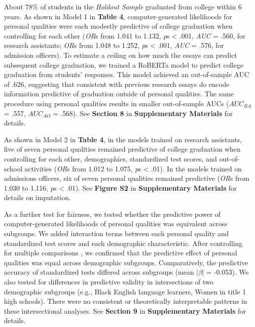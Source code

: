 \documentclass[11pt]{report}
\begin{document}
\begin{mainf}
About 78\% of students in the \textit{Holdout Sample} graduated from college within 6 years. As shown in Model 1 in \textbf{Table 4}, computer-generated likelihoods for personal qualities were each modestly predictive of college graduation when controlling for each other (\textit{OR}s from 1.041 to 1.132, \textit{p}s < .001, \textit{AUC} = .560, for research assistants; \textit{OR}s from 1.048 to 1.252, \textit{p}s < .001, \textit{AUC} = .576, for admission officers). To estimate a ceiling on how much the essays can predict subsequent college graduation, we trained a RoBERTa model to predict college graduation from students' responses. This model achieved an out-of-sample AUC of .626, suggesting that consistent with previous research \cite{alvero_essay_2021} essays do encode information predictive of graduation outside of personal qualities. The same procedure using personal qualities results in smaller out-of-sample AUCs ($AUC_{RA}$ = .557, $AUC_{AO}$ = .568). See \textbf{Section 8} in \textbf{Supplementary Materials} for details.

As shown in Model 2 in \textbf{Table 4}, in the models trained on research assistants, five of seven personal qualities remained predictive of college graduation when controlling for each other, demographics, standardized test scores, and out-of-school activities (\textit{OR}s from 1.012 to 1.075, \textit{p}s < .01). In the models trained on admissions officers, six of seven personal qualities remained predictive (\textit{OR}s from 1.030 to 1.116, \textit{p}s < .01). See \textbf{Figure S2} in \textbf{Supplementary Materials} for details on imputation.

As a further test for fairness, we tested whether the predictive power of computer-generated likelihoods of personal qualities was equivalent across subgroups. We added interaction terms between each personal quality and standardized test scores and each demographic characteristic. After controlling for multiple comparisons \cite{benjamini_control_2001}, we confirmed that the predictive effect of personal qualities was equal across demographic subgroups. Comparatively, the predictive accuracy of standardized tests differed across subgroups (mean $|\beta|$ = -0.053). We also tested for differences in predictive validity in intersections of two demographic subgroups (e.g., Black English language learners, Women in title 1 high schools). There were no consistent or theoretically interpretable patterns in these intersectional analyses. See \textbf{Section 9} in \textbf{Supplementary Materials} for details.


\end{mainf}
\end{document}
